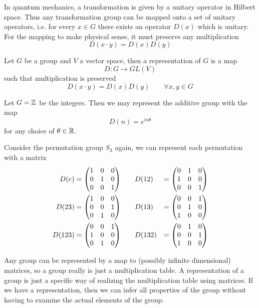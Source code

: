 In quantum mechanics, a transformation is given by a unitary operator in Hilbert space. Thus any transformation group can be mapped onto a set of unitary operators, i.e. for every $x \in G$ there exists an operator $D(x)$ which is unitary. For the mapping to make physical sense, it must preserve any multiplication
\[ D(x \cdot y) = D(x) D(y) \]

\begin{definition}[Representations]
	Let $G$ be a group and $V$ a vector space, then a representation of $G$ is a map
	\[ D: G \to GL(V) \]
	such that multiplication is preserved
	\[ D(x \cdot y) = D(x) D(y) \qquad \forall x,y \in G \]
\end{definition}

\begin{example}
	Let $G = \mathbb{Z}$ be the integers. Then we may represent the additive group with the map
	\[ D(n) = e^{in\theta} \]
	for any choice of $\theta \in \mathbb{R}$.
\end{example}

\begin{example}
	Consider the permutation group $S_3$ again, we can represent each permutation with a matrix
	\[ \begin{aligned}
		D(e) &= \mqty(\imat{3}) \qquad D(12) &= \mqty(0 & 1 & 0 \\ 1 & 0 & 0 \\ 0 & 0 & 1) \\
		D(23) &= \mqty(1 & 0 & 0 \\ 0 & 0 & 1 \\ 0 & 1 & 0) \qquad D(13) &= \mqty(0 & 0 & 1 \\ 0 & 1 & 0 \\ 1 & 0 & 0) \\
		D(123) &= \mqty(0 & 0 & 1 \\ 1 & 0 & 0 \\ 0 & 1 & 0) \qquad D(132) &= \mqty(0 & 1 & 0 \\ 0 & 0 & 1 \\ 1 & 0 & 0)
	\end{aligned} \]
\end{example}

Any group can be represented by a map to (possibly infinite dimensional) matrices, so a group really is just a multiplication table. A representation of a group is just a specific way of realizing the multiplication table using matrices. If we have a representation, then we can infer all properties of the group without having to examine the actual elements of the group.

